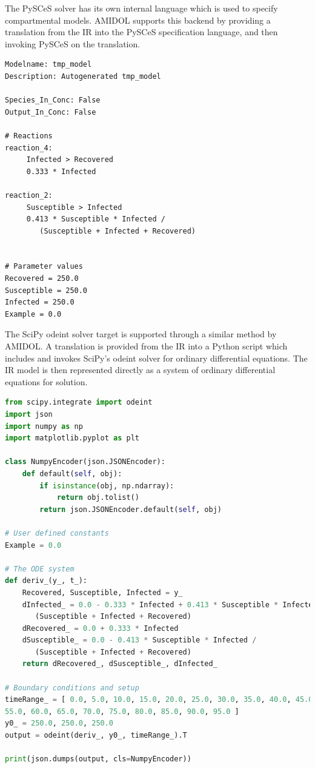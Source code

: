 \documentclass[11pt]{article}
\newcommand{\amidol}{\textsc{AMIDOL}}
\begin{document}
The PySCeS solver has its own internal language which is used to specify compartmental models.  \amidol{} supports this backend by providing a translation from the IR into the PySCeS specification language, and then invoking PySCeS on the translation.

\begin{verbatim}
Modelname: tmp_model
Description: Autogenerated tmp_model

Species_In_Conc: False
Output_In_Conc: False

# Reactions
reaction_4:
     Infected > Recovered
     0.333 * Infected

reaction_2:
     Susceptible > Infected
     0.413 * Susceptible * Infected / 
        (Susceptible + Infected + Recovered)


# Parameter values
Recovered = 250.0
Susceptible = 250.0
Infected = 250.0
Example = 0.0
\end{verbatim}

The SciPy odeint solver target is supported through a similar method by \amidol{}.  A translation is provided from the IR into a Python script which includes and invokes SciPy's odeint solver for ordinary differential equations.  The IR model is then represented directly as a system of ordinary differential equations for solution.

\begin{lstlisting}[language=python]
from scipy.integrate import odeint
import json
import numpy as np
import matplotlib.pyplot as plt

class NumpyEncoder(json.JSONEncoder):
    def default(self, obj):
        if isinstance(obj, np.ndarray):
            return obj.tolist()
        return json.JSONEncoder.default(self, obj)

# User defined constants
Example = 0.0

# The ODE system
def deriv_(y_, t_):
    Recovered, Susceptible, Infected = y_
    dInfected_ = 0.0 - 0.333 * Infected + 0.413 * Susceptible * Infected /
       (Susceptible + Infected + Recovered)
    dRecovered_ = 0.0 + 0.333 * Infected
    dSusceptible_ = 0.0 - 0.413 * Susceptible * Infected /
       (Susceptible + Infected + Recovered)
    return dRecovered_, dSusceptible_, dInfected_

# Boundary conditions and setup
timeRange_ = [ 0.0, 5.0, 10.0, 15.0, 20.0, 25.0, 30.0, 35.0, 40.0, 45.0, 50.0,
55.0, 60.0, 65.0, 70.0, 75.0, 80.0, 85.0, 90.0, 95.0 ]
y0_ = 250.0, 250.0, 250.0
output = odeint(deriv_, y0_, timeRange_).T

print(json.dumps(output, cls=NumpyEncoder))
\end{lstlisting}
\end{document}
